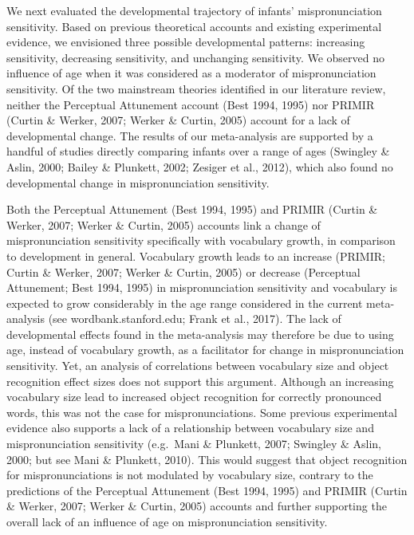 \documentclass[man]{apa6}
\theoremstyle{definition}
\theoremstyle{definition}
\theoremstyle{definition}
\theoremstyle{remark}
\begin{document}
We next evaluated the developmental trajectory of infants'
mispronunciation sensitivity. Based on previous theoretical accounts and
existing experimental evidence, we envisioned three possible
developmental patterns: increasing sensitivity, decreasing sensitivity,
and unchanging sensitivity. We observed no influence of age when it was
considered as a moderator of mispronunciation sensitivity. Of the two
mainstream theories identified in our literature review, neither the
Perceptual Attunement account (Best 1994, 1995) nor PRIMIR (Curtin \&
Werker, 2007; Werker \& Curtin, 2005) account for a lack of
developmental change. The results of our meta-analysis are supported by
a handful of studies directly comparing infants over a range of ages
(Swingley \& Aslin, 2000; Bailey \& Plunkett, 2002; Zesiger et al.,
2012), which also found no developmental change in mispronunciation
sensitivity.

Both the Perceptual Attunement (Best 1994, 1995) and PRIMIR (Curtin \&
Werker, 2007; Werker \& Curtin, 2005) accounts link a change of
mispronunciation sensitivity specifically with vocabulary growth, in
comparison to development in general. Vocabulary growth leads to an
increase (PRIMIR; Curtin \& Werker, 2007; Werker \& Curtin, 2005) or
decrease (Perceptual Attunement; Best 1994, 1995) in mispronunciation
sensitivity and vocabulary is expected to grow considerably in the age
range considered in the current meta-analysis (see
wordbank.stanford.edu; Frank et al., 2017). The lack of developmental
effects found in the meta-analysis may therefore be due to using age,
instead of vocabulary growth, as a facilitator for change in
mispronunciation sensitivity. Yet, an analysis of correlations between
vocabulary size and object recognition effect sizes does not support
this argument. Although an increasing vocabulary size lead to increased
object recognition for correctly pronounced words, this was not the case
for mispronunciations. Some previous experimental evidence also supports
a lack of a relationship between vocabulary size and mispronunciation
sensitivity (e.g.~Mani \& Plunkett, 2007; Swingley \& Aslin, 2000; but
see Mani \& Plunkett, 2010). This would suggest that object recognition
for mispronunciations is not modulated by vocabulary size, contrary to
the predictions of the Perceptual Attunement (Best 1994, 1995) and
PRIMIR (Curtin \& Werker, 2007; Werker \& Curtin, 2005) accounts and
further supporting the overall lack of an influence of age on
mispronunciation sensitivity.
\end{document}
